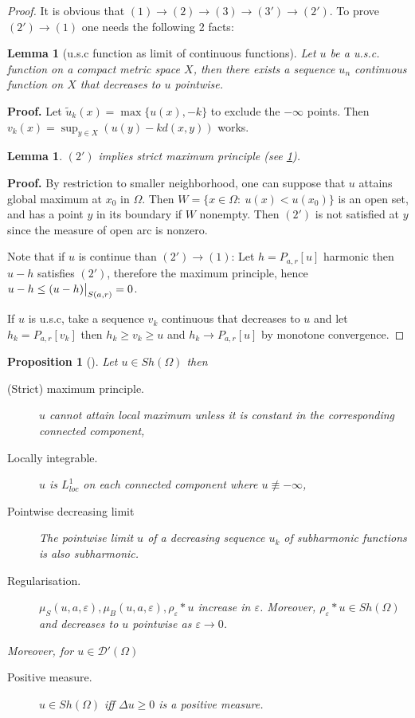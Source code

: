 \documentclass[11pt]{article}
\newtheorem{lemma}[theorem]{Lemma}
\newtheorem{proposition}{Proposition}[theorem]
\newcommand\restr[2]{{%
\left.\kern-\nulldelimiterspace %
#1 %
\vphantom{\big|} %
\right|_{#2} %
}}
\begin{document}
\begin{proof}
It is obvious that \((1) \to (2) \to (3) \to (3')\to (2')\). To prove \((2')\to (1)\)
one needs the following 2 facts:

\begin{lemma}[u.s.c function as limit of continuous functions]
Let \(u\) be a u.s.c. function on a compact metric space \(X\), then there exists a
sequence \(u_n\) continuous function on \(X\) that decreases to \(u\) pointwise.
\end{lemma}
\textbf{Proof.} Let \(\tilde u_k(x) = \max \{u(x), -k \}\) to exclude the \(-\infty\) points. Then \(v_k(x) = \sup_{y\in X} \left(u(y) - kd(x,y)\right)\) works.


\begin{lemma}
\((2')\) implies strict maximum principle (see \ref{prop:subhar}).
\end{lemma}
\textbf{Proof.} By restriction to smaller neighborhood, one can suppose that \(u\) attains global
maximum at \(x_0\) in \(\Omega\). Then \(W=\{x\in \Omega:\ u(x) < u(x_0)\}\) is an
open set, and has a point \(y\) in its boundary if \(W\) nonempty. Then \((2')\) is
not satisfied at \(y\) since the measure of open arc is nonzero.


Note that if \(u\) is continue than \((2') \to (1)\): Let \(h = P_{a,r}[u]\)
harmonic then \(u-h\) satisfies \((2')\), therefore the maximum principle, hence \(u-h\leq \restr{(u-h)}{S(a,r)} = 0\).

If \(u\) is u.s.c, take a sequence \(v_k\) continuous that decreases to \(u\) and
let \(h_k = P_{a,r}[v_k]\) then \(h_k\geq v_k\geq u\) and \(h_k\to P_{a,r}[u]\) by
monotone convergence.
\end{proof}







\begin{proposition}[]
\label{prop:subhar}
Let \(u\in Sh(\Omega)\) then
\begin{description}
\item[{(Strict) maximum principle.}] \(u\) cannot attain local maximum unless it is constant in the corresponding connected component,
\item[{Locally integrable.}] \(u\) is \(L^1_{loc}\) on each connected component where \(u\not\equiv -\infty\),
\item[{Pointwise decreasing limit}] The pointwise limit \(u\) of a decreasing sequence \(u_k\) of
subharmonic functions is also subharmonic.
\item[{Regularisation.}] \(\mu_S(u,a,\varepsilon),\mu_B(u,a,\varepsilon),\rho_\varepsilon
                    \ast u\) increase in \(\varepsilon\). Moreover, \(\rho_\varepsilon * u \in
                    Sh(\Omega)\) and decreases to \(u\) pointwise as \(\varepsilon \to
                    0\).
\end{description}
Moreover, for \(u\in \mathcal{D}'(\Omega)\)
\begin{description}
\item[{Positive measure.}] \(u\in Sh(\Omega)\) iff \(\Delta u \geq 0\) is a positive measure.
\end{description}
\end{proposition}
\end{document}
